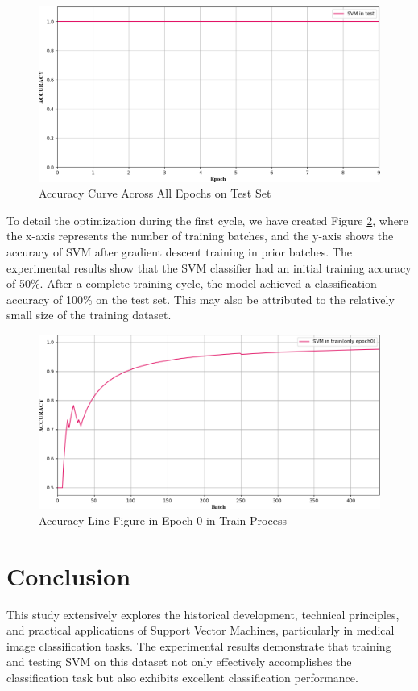 \documentclass[twocolumn]{article}
\begin{document}
\begin{figure}[h]
	\centering
	\includegraphics[width=1.0\linewidth]{exp_log/train440_valid024/ACCURACY_test}
	\caption{Accuracy Curve Across All Epochs on Test Set}
	\label{fig:acc_test}
\end{figure}

To detail the optimization during the first cycle, we have created Figure \ref{fig:acc_train_e0}, where the x-axis represents the number of training batches, and the y-axis shows the accuracy of SVM after gradient descent training in prior batches. The experimental results show that the SVM classifier had an initial training accuracy of 50\%.
After a complete training cycle, the model achieved a classification accuracy of 100\% on the test set. This may also be attributed to the relatively small size of the training dataset.

\begin{figure}[h]
	\centering
	\includegraphics[width=1.0\linewidth]{exp_log/train440_valid024/ACCURACY_train_epoch0}
	\caption[acc_train_e0]{Accuracy Line Figure in Epoch 0 in Train Process}
	\label{fig:acc_train_e0}
\end{figure}

\section{Conclusion}
This study extensively explores the historical development, technical principles, and practical applications of Support Vector Machines, particularly in medical image classification tasks. The experimental results demonstrate that training and testing SVM on this dataset not only effectively accomplishes the classification task but also exhibits excellent classification performance.
\end{document}
